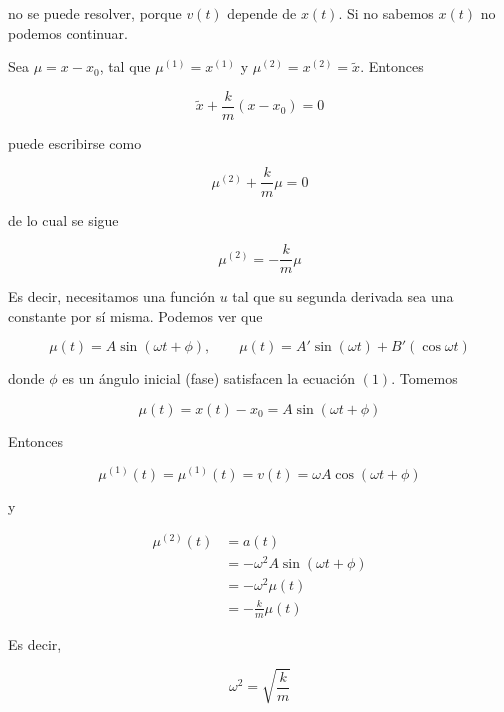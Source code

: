 \documentclass[12pt]{article}
\theoremstyle{definition}
\begin{document}
no se puede resolver, porque $v(t)$ depende de $x(t)$. Si no sabemos $x(t)$ no
podemos continuar.

Sea $\mu = x - x_0$, tal que $\mu^{(1)} = x^{(1)}$ y $\mu^{(2)} = x^{(2)} =
\widetilde{ x } $. Entonces 

\begin{equation*}
    \widetilde{ x }  + \frac{k}{m}(x - x_0) = 0
\end{equation*}

puede escribirse como 

\begin{equation*}
    \mu^{(2)} + \frac{k}{m}\mu = 0
\end{equation*}

de lo cual se sigue 

\begin{equation}
    \mu^{(2)} = -\frac{k}{m}\mu
\end{equation}

Es decir, necesitamos una función $u$ tal que su segunda derivada sea una
constante por sí misma. Podemos ver que 

\begin{equation*}
    \mu(t) 
    = A \sin\left( \omega  t + \phi \right), \qquad \mu(t) = A' \sin(\omega t) + B'
(\cos \omega  t) \end{equation*}

donde $\phi$ es un ángulo inicial (fase) satisfacen la ecuación $(1)$. Tomemos 

\begin{equation*}
    \mu(t) = x(t) - x_0 = A \sin(\omega t + \phi)
\end{equation*}

Entonces 

\begin{equation*}
    \mu^{(1)}(t) = \mu^{(1)}(t) = v(t) = \omega A \cos(\omega t + \phi)
\end{equation*}

y 

\begin{align*}
    \mu^{(2)}(t) 
    &= a(t) \\
    &= - \omega^2 A \sin(\omega t + \phi) \\ 
    &= -\omega^2 \mu(t) \\ 
    &= -\frac{k}{m}\mu(t)
\end{align*}

Es decir, 

\begin{equation*}
    \omega^2 =\sqrt{\frac{k}{m}}  
\end{equation*}
\end{document}
